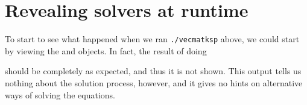 \vfill
\clearpage
{}


\section{Revealing solvers at runtime}

To start to see what happened when we ran \texttt{./vecmatksp} above, we could start by viewing the \pVec and \pMat objects.  In fact, the result of doing
should be completely as expected, and thus it is not shown.  This output tells us nothing about the solution process, however, and it gives no hints on alternative ways of solving the equations.


